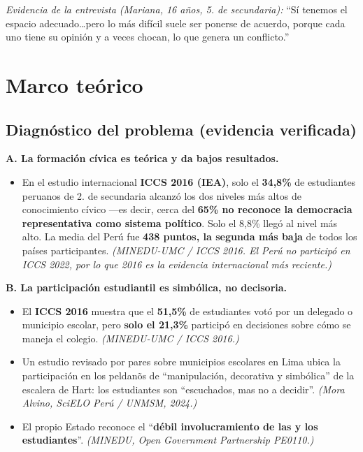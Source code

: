 \documentclass[11pt,a4paper]{article}
\begin{document}
\noindent\textit{Evidencia de la entrevista (Mariana, 16 a\~nos, 5.\textordmasculine{} de secundaria):} ``S\'i tenemos el espacio adecuado\dots pero lo m\'as dif\'icil suele ser ponerse de acuerdo, porque cada uno tiene su opini\'on y a veces chocan, lo que genera un conflicto.''

\section{Marco te\'orico}

\subsection{Diagn\'ostico del problema (evidencia verificada)}

\noindent\textbf{A. La formaci\'on c\'ivica es te\'orica y da bajos resultados.}
\begin{itemize}[leftmargin=*]
  \item En el estudio internacional \textbf{ICCS 2016 (IEA)}, solo el \textbf{34,8\%} de estudiantes peruanos de 2.\textordmasculine{} de secundaria alcanz\'o los dos niveles m\'as altos de conocimiento c\'ivico ---es decir, cerca del \textbf{65\% no reconoce la democracia representativa como sistema pol\'itico}. Solo el 8,8\% lleg\'o al nivel m\'as alto. La media del Per\'u fue \textbf{438 puntos, la segunda m\'as baja} de todos los pa\'ises participantes. \textit{(MINEDU-UMC / ICCS 2016. El Per\'u no particip\'o en ICCS 2022, por lo que 2016 es la evidencia internacional m\'as reciente.)}
\end{itemize}

\noindent\textbf{B. La participaci\'on estudiantil es simb\'olica, no decisoria.}
\begin{itemize}[leftmargin=*]
  \item El \textbf{ICCS 2016} muestra que el \textbf{51,5\%} de estudiantes vot\'o por un delegado o municipio escolar, pero \textbf{solo el 21,3\%} particip\'o en decisiones sobre c\'omo se maneja el colegio. \textit{(MINEDU-UMC / ICCS 2016.)}
  \item Un estudio revisado por pares sobre municipios escolares en Lima ubica la participaci\'on en los peldan\~os de ``manipulaci\'on, decorativa y simb\'olica'' de la escalera de Hart: los estudiantes son ``escuchados, mas no a decidir''. \textit{(Mora Alvino, SciELO Per\'u / UNMSM, 2024.)}
  \item El propio Estado reconoce el ``\textbf{d\'ebil involucramiento de las y los estudiantes}''. \textit{(MINEDU, Open Government Partnership PE0110.)}
\end{itemize}
\end{document}
